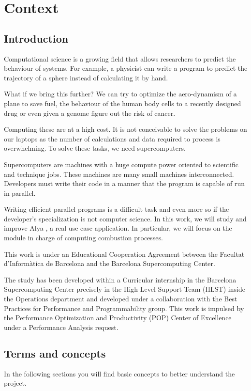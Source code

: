 \section{Context}

\subsection{Introduction}

\justify
Computational science is a growing field that allows researchers to predict the behaviour of systems. For example, a physicist can write a program to predict the trajectory of a sphere instead of calculating it by hand.

\justify
 What if we bring this further?  We can try to optimize the aero-dynamism of a plane to save fuel, the behaviour of the human body cells to a recently designed drug or even given a genome figure out the risk of cancer.

\justify
Computing these are at a high cost. It is not conceivable to solve the problems on our laptops as the number of calculations and data required to process is overwhelming. To solve these tasks, we need supercomputers.

\justify
Supercomputers are machines with a huge compute power oriented to scientific and technique jobs. These machines are many small machines interconnected. Developers must write their code in a manner that the program is capable of run in parallel. 

\justify
Writing efficient parallel programs is a difficult task and even more so if the developer's specialization is not computer science. In this work, we will study and improve Alya \cite{alya}, a real use case application. In particular, we will focus on the module in charge of computing combustion processes.


\justify
This work is under an Educational Cooperation Agreement between the Facultat d'Informàtica de Barcelona and the Barcelona Supercomputing Center.

\justify
The study has been developed within a Curricular internship in the Barcelona Supercomputing Center precisely in the High-Level Support Team (HLST) inside the Operations department and developed under a collaboration with the Best Practices for Performance and Programmability group. This work is impulsed by the Performance Optimization and Productivity \cite{popWeb} (POP) Center of Excellence under a  Performance Analysis request.

\subsection{Terms and concepts}
\justify
In the following sections you will find basic concepts to better understand the project.

